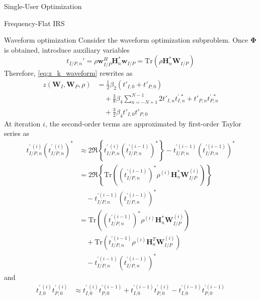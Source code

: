 \documentclass{IEEEtran}
\begin{document}
\begin{section}{Single-User Optimization}
\begin{subsection}{Frequency-Flat IRS}
		\begin{subsubsection}{Waveform optimization}
			Consider the waveform optimization subproblem. Once $\boldsymbol{\Phi}$ is obtained, introduce auxiliary variables
			\begin{equation}\label{eq:t'}
				t_{I/P,n}' = \rho \boldsymbol{w}_{I/P}^H \boldsymbol{H}_n^* \boldsymbol{w}_{I/P} = \mathrm{Tr}(\rho \boldsymbol{H}_n^*\boldsymbol{W}_{I/P})
			\end{equation}
			Therefore, \ref{eq:z_k_waveform} rewrites as
			\begin{equation}\label{eq:z_waveform}
				\begin{split}
					z(\boldsymbol{W}_I,\boldsymbol{W}_P,\rho)
					&=\frac{1}{2} \beta_2 (t'_{I,0}+t'_{P,0})\\
					&\quad+\frac{3}{8} \beta_4 \sum_{n=-N+1}^{N-1}{2t'_{I,n}t_{I,n}^{\prime \ *}+t'_{P,n}t_{P,n}^{\prime \ *}}\\
					&\quad+\frac{3}{2} \beta_4 t'_{I,0}t'_{P,0}
				\end{split}
			\end{equation}
			At iteration $i$, the second-order terms are approximated by first-order Taylor series as
			\begin{equation}
				\begin{split}
					t_{I/P,n}^{\prime \ (i)} (t_{I/P,n}^{\prime \ (i)})^*
					& \approx 2 \Re\left\{t_{I/P,n}^{\prime \ (i)} (t_{I/P,n}^{\prime (i-1)})^*\right\} - t_{I/P,n}^{\prime (i-1)} (t_{I/P,n}^{\prime (i-1)})^* \\
					& = 2 \Re \left\{\mathrm{Tr}\left((t_{I/P,n}^{\prime (i-1)})^*\rho^{(i)}\boldsymbol{H}_{n}^*\boldsymbol{W}_{I/P}^{(i)}\right)\right\}\\
					& \quad - t_{I/P,n}^{\prime (i-1)} (t_{I/P,n}^{\prime (i-1)})^*\\
					& = \mathrm{Tr}\left((t_{I/P,n}^{\prime (i-1)})^*\rho^{(i)}\boldsymbol{H}_{n}^*\boldsymbol{W}_{I/P}^{(i)}\right)\\
					& \quad + \mathrm{Tr}\left(t_{I/P,n}^{\prime (i-1)}\rho^{(i)}\boldsymbol{H}_{n}^T\boldsymbol{W}_{I/P}^{(i)}\right)\\
					& \quad - t_{I/P,n}^{\prime (i-1)} (t_{I/P,n}^{\prime (i-1)})^*
				\end{split}
			\end{equation}
			and
			\begin{equation}
				\begin{split}
					t_{I,0}^{\prime \ (i)} t_{P,0}^{\prime \ (i)}
					& \approx t_{I,0}^{\prime \ (i)} t_{P,0}^{\prime (i-1)} + t_{I,0}^{\prime (i-1)} t_{P,0}^{\prime \ (i)} - t_{I,0}^{\prime (i-1)} t_{P,0}^{\prime (i-1)}\\

\end{split}
\end{equation}
\end{subsubsection}
\end{subsection}
\end{section}
\end{document}

